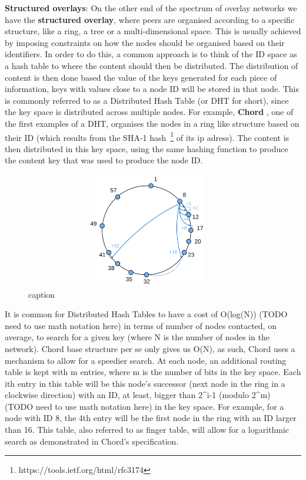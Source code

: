 \textbf{Structured overlays}: On the other end of the spectrum of
overlay networks we have the \textbf{structured overlay}, where peers
are organised according to a specific structure, like a ring, a tree or
a multi-dimensional space. This is usually achieved by imposing
constraints on how the nodes should be organised based on their
identifiers. In order to do this, a common approach is to think of the
ID space as a hash table to where the content should then be
distributed. The distribution of content is then done based the value of
the keys generated for each piece of information, keys with values close
to a node ID will be stored in that node. This is commonly referred to
as a Distributed Hash Table (or DHT for short), since the key space is
distributed across multiple nodes. For example, \textbf{Chord} \cite{Stoica2001},
one of the first examples of a DHT, organises the nodes in a ring like structure
based on their ID (which results from the SHA-1 hash~\footnote{https://tools.ietf.org/html/rfc3174}
of its ip adress). The content is then distributed in this key space, using the same hashing function to
produce the content key that was used to produce the node ID.

\begin{figure}[hb!]
  \centering
  \includegraphics[max height=5cm,max width=0.95\textwidth]{img/chord.png}
  \caption{caption}
  \label{fig:chord}
\end{figure}

It is common for Distributed Hash Tables to have a cost of O(log(N))
(TODO need to use math notation here) in terms of number of nodes
contacted, on average, to search for a given key (where N is the number
of nodes in the network). Chord base structure per se only gives us
O(N), as such, Chord uses a mechanism to allow for a speedier search. At
each node, an additional routing table is kept with m entries, where m
is the number of bits in the key space. Each ith entry in this table
will be this node's successor (next node in the ring in a clockwise
direction) with an ID, at least, bigger than 2\^{}i-1 (modulo 2\^{}m)
(TODO need to use math notation here) in the key space. For example, for
a node with ID 8, the 4th entry will be the first node in the ring with
an ID larger than 16. This table, also referred to as finger table, will
allow for a logarithmic search as demonstrated in Chord's specification.

